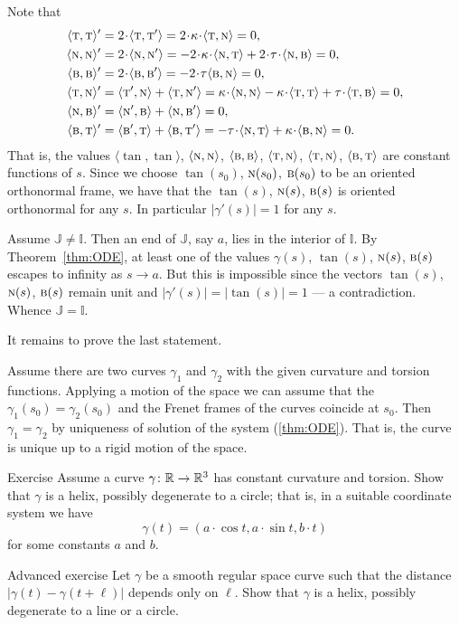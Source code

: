 Note that 
\begin{align*}
\langle\tan,\tan\rangle'
&=
2\cdot\langle\tan,\tan'\rangle
=
2\cdot\kur\cdot \langle\tan,\norm\rangle
=
0,
\\
\langle\norm,\norm\rangle'
&=
2\cdot\langle\norm,\norm'\rangle
=
-
2\cdot\kur\cdot\langle\norm,\tan\rangle
+
2\cdot\tor\cdot\langle\norm,\bi\rangle
=
0,
\\
\langle\bi,\bi\rangle'
&=
2\cdot\langle\bi,\bi'\rangle
=
-2\cdot\tor\langle\bi,\norm\rangle
=
0,
\\
\langle\tan,\norm\rangle'
&=
\langle\tan',\norm\rangle
+
\langle\tan,\norm'\rangle
=
\kur\cdot\langle\norm,\norm\rangle
-
\kur\cdot\langle\tan,\tan\rangle
+
\tor\cdot\langle\tan,\bi\rangle
=
0,
\\
\langle\norm,\bi\rangle'
&=
\langle\norm',\bi\rangle+\langle\norm,\bi'\rangle
=0,
\\
\langle\bi,\tan\rangle'
&=
\langle\bi',\tan\rangle+\langle\bi,\tan'\rangle
=
-\tor\cdot \langle\norm,\tan\rangle
+\kur\cdot\langle\bi,\norm\rangle
=0.
\end{align*}
That is, the values 
$\langle\tan,\tan\rangle$,
$\langle\textsc{n},\textsc{n}\rangle$,
$\langle\textsc{b},\textsc{b}\rangle$,
$\langle\textsc{t},\textsc{n}\rangle$,
$\langle\textsc{t},\textsc{n}\rangle$,
$\langle\textsc{b},\textsc{t}\rangle$
are constant functions of $s$.
Since we choose $\tan(s_0)$, $\textsc{n}(s_0)$, $\textsc{b}(s_0)$ to be an oriented orthonormal frame, we have that the $\tan(s)$, $\textsc{n}(s)$, $\textsc{b}(s)$ is oriented orthonormal for any $s$.
In particular $|\gamma'(s)|=1$ for any $s$.

Assume $\mathbb{J}\ne \mathbb{I}$.
Then an end of $\mathbb{J}$, say $a$, lies in the interior of $\mathbb{I}$.
By Theorem~\ref{thm:ODE}, at least one of the values $\gamma(s)$, $\tan(s)$, $\textsc{n}(s)$, $\textsc{b}(s)$
escapes to infinity as $s\to a$.
But this is impossible since the vectors $\tan(s)$, $\textsc{n}(s)$, $\textsc{b}(s)$ remain unit and $|\gamma'(s)|=|\tan(s)|=1$ --- a contradiction.
Whence $\mathbb{J}= \mathbb{I}$.

It remains to prove the last statement.

Assume there are two curves $\gamma_1$ and $\gamma_2$ with the given curvature and torsion functions.
Applying a motion of the space we can assume that the $\gamma_1(s_0)=\gamma_2(s_0)$ and the Frenet frames of the curves coincide at $s_0$.
Then $\gamma_1=\gamma_2$ by uniqueness of solution of the system (\ref{thm:ODE}).
That is, the curve is unique up to a rigid motion of the space.
\qeds

\begin{thm}{Exercise}\label{ex:cur+tor=helix}
Assume a curve $\gamma\colon\mathbb{R}\to\mathbb{R}^3$ has constant curvature and torsion.
Show that $\gamma$ is a helix, possibly degenerate to a circle;
that is, in a suitable coordinate system we have
\[\gamma(t)=(a\cdot \cos t,a\cdot\sin t, b\cdot t)\]
for some constants $a$ and $b$.
\end{thm}


\begin{thm}{Advanced exercise}\label{ex:const-dist}
Let $\gamma$ be a smooth regular space curve such that the distance $|\gamma(t)-\gamma(t+\ell)|$ depends only on $\ell$.
Show that $\gamma$ is a helix, possibly degenerate to a line or a circle.
\end{thm}

